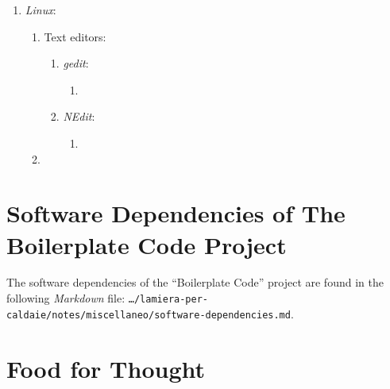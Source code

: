 \begin{enumerate}
\begin{enumerate}
\begin{enumerate}
		\end{enumerate}
	\end{enumerate}
\item {\it Linux}: \vspace{-0.3cm}
	\begin{enumerate} \itemsep -2pt
	\item Text editors: \vspace{-0.2cm}
		\begin{enumerate} \itemsep -2pt
		\item {\it gedit}: \vspace{-0.1cm}
			\begin{enumerate} \itemsep -1pt
			\item 
			\end{enumerate}
		\item {\it NEdit}: \vspace{-0.1cm}
			\begin{enumerate} \itemsep -1pt
			\item 
			\end{enumerate}
		\end{enumerate}
	\item 
	\end{enumerate}
\end{enumerate}








\section{Software Dependencies of The Boilerplate Code Project}
\label{sec:SoftwareDependenciesOfTheBoilerplateCodeProject}


The software dependencies of the ``Boilerplate Code'' project are found in the following {\it Markdown} file: {\tt \dots/lamiera-per-caldaie/notes/miscellaneo/software-dependencies.md}.








\section{Food for Thought}
\label{sec:FoodForThought}


